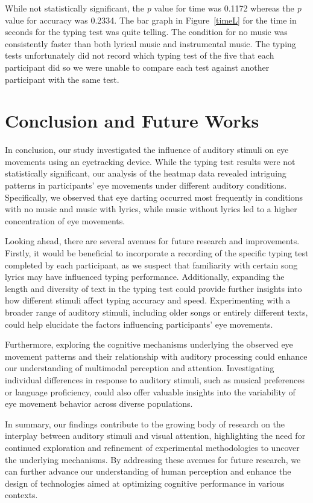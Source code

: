 \documentclass[manuscript, screen, review]{acmart} %
\begin{document}
While not statistically significant, the \textit{p} value for time was 0.1172 whereas the \textit{p} value for accuracy was 0.2334.
The bar graph in Figure~\ref{timeL} for the time in seconds for the typing test was quite telling. The condition for no music was consistently faster than both
lyrical music and instrumental music. The typing tests unfortunately did not record which typing test of the five that each participant did so we
were unable to compare each test against another participant with the same test.

\section{Conclusion and Future Works}
In conclusion, our study investigated the influence of auditory stimuli on eye movements using an eyetracking device. While the typing test results were not statistically significant, our analysis of the heatmap data revealed intriguing patterns in participants' eye movements under different auditory conditions. Specifically, we observed that eye darting occurred most frequently in conditions with no music and music with lyrics, while music without lyrics led to a higher concentration of eye movements.

Looking ahead, there are several avenues for future research and improvements. Firstly, it would be beneficial to incorporate a recording of the specific typing test completed by each participant, as we suspect that familiarity with certain song lyrics may have influenced typing performance. Additionally, expanding the length and diversity of text in the typing test could provide further insights into how different stimuli affect typing accuracy and speed. Experimenting with a broader range of auditory stimuli, including older songs or entirely different texts, could help elucidate the factors influencing participants' eye movements.

Furthermore, exploring the cognitive mechanisms underlying the observed eye movement patterns and their relationship with auditory processing could enhance our understanding of multimodal perception and attention. Investigating individual differences in response to auditory stimuli, such as musical preferences or language proficiency, could also offer valuable insights into the variability of eye movement behavior across diverse populations.

In summary, our findings contribute to the growing body of research on the interplay between auditory stimuli and visual attention, highlighting the need for continued exploration and refinement of experimental methodologies to uncover the underlying mechanisms. By addressing these avenues for future research, we can further advance our understanding of human perception and enhance the design of technologies aimed at optimizing cognitive performance in various contexts.




\end{document}
